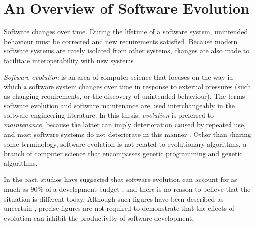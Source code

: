 \section{An Overview of Software Evolution}
\label{sec:intro_to_software_evo}
Software changes over time. During the lifetime of a software system, unintended behaviour must be corrected and new requirements satisfied. Because modern software systems are rarely isolated from other systems, changes are also made to facilitate interoperability with new systems \cite{sjoberg93quantifying}. 

% 

\emph{Software evolution} is an area of computer science that focuses on the way in which a software system changes over time in response to external pressures (such as changing requirements, or the discovery of unintended behaviour). The terms software evolution and software maintenance are used interchangeably in the software engineering literature. In this thesis, \emph{evolution} is preferred to \emph{maintenance}, because the latter can imply deterioration caused by repeated use, and most software systems do not deteriorate in this manner \cite{ramil00cost}. Other than sharing some terminology, software evolution is not related to evolutionary algorithms, a branch of computer science that encompasses genetic programming and genetic algorithms. 

In the past, studies have suggested that software evolution can account for as much as 90\% of a development budget \cite{erlikh00leveraging,moad90maintaining}, and there is no reason to believe that the situation is different today. Although \cc such figures have been described as uncertain \cite[ch. 21]{sommerville06software}, precise figures are not required to demonstrate that the effects of evolution can inhibit the productivity of software development.

